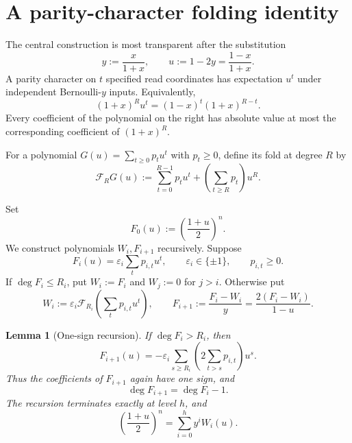 \documentclass[11pt]{article}
\newtheorem{lemma}[theorem]{Lemma}
\theoremstyle{definition}
\theoremstyle{remark}
\newcommand{\eps}{\varepsilon}
\begin{document}
\section{A parity-character folding identity}

The central construction is most transparent after the substitution
\begin{equation}\label{eq:y-u}
 y:=\frac{x}{1+x},
 \qquad
 u:=1-2y=\frac{1-x}{1+x}.
\end{equation}
A parity character on $t$ specified read coordinates has expectation $u^t$ under independent Bernoulli-$y$ inputs.  Equivalently,
\begin{equation}\label{eq:parity-character}
 (1+x)^{R}u^t=(1-x)^t(1+x)^{R-t}.
\end{equation}
Every coefficient of the polynomial on the right has absolute value at most the corresponding coefficient of $(1+x)^R$.

For a polynomial $G(u)=\sum_{t\ge0}p_tu^t$ with $p_t\ge0$, define its fold at degree $R$ by
\begin{equation}\label{eq:fold}
 \mathcal F_R G(u)
 :=\sum_{t=0}^{R-1}p_tu^t+
   \left(\sum_{t\ge R}p_t\right)u^R.
\end{equation}

Set
\begin{equation}\label{eq:F0}
 F_0(u):=\left(\frac{1+u}{2}\right)^n.
\end{equation}
We construct polynomials $W_i,F_{i+1}$ recursively.  Suppose
\[
 F_i(u)=\eps_i\sum_t p_{i,t}u^t,
 \qquad
 \eps_i\in\{\pm1\},
 \qquad
 p_{i,t}\ge0.
\]
If $\deg F_i\le R_i$, put $W_i:=F_i$ and $W_j:=0$ for $j>i$.  Otherwise put
\begin{equation}\label{eq:fold-recursion}
 W_i:=\eps_i\mathcal F_{R_i}\!\left(\sum_tp_{i,t}u^t\right),
 \qquad
 F_{i+1}:=\frac{F_i-W_i}{y}
          =\frac{2(F_i-W_i)}{1-u}.
\end{equation}

\begin{lemma}[One-sign recursion]\label{lem:one-sign}
If $\deg F_i>R_i$, then
\begin{equation}\label{eq:Fnext-coeff}
 F_{i+1}(u)
 =-\eps_i\sum_{s\ge R_i}
   \left(2\sum_{t>s}p_{i,t}\right)u^s.
\end{equation}
Thus the coefficients of $F_{i+1}$ again have one sign, and
\[
 \deg F_{i+1}=\deg F_i-1.
\]
The recursion terminates exactly at level $h$, and
\begin{equation}\label{eq:fold-telescope}
 \left(\frac{1+u}{2}\right)^n
 =\sum_{i=0}^{h}y^iW_i(u).
\end{equation}
\end{lemma}
\end{document}
